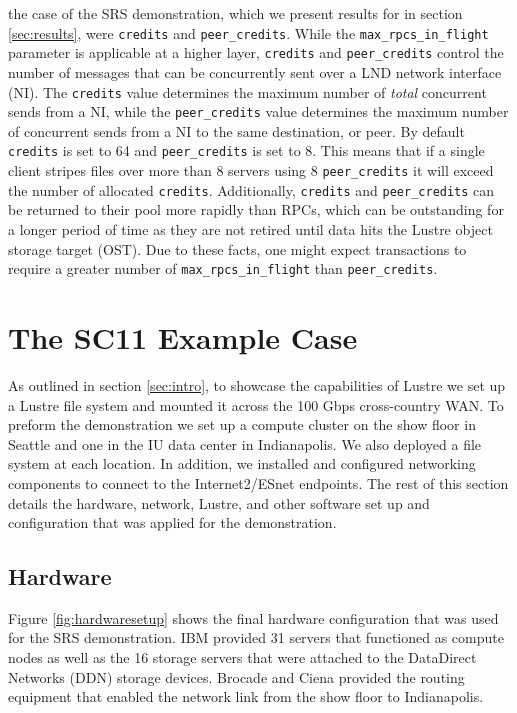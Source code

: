 \documentclass[]{sigplan-proc}
\begin{document}
the case of the SRS demonstration, which we present results for in section \ref{sec:results}, were 
{\tt credits} and {\tt peer\_credits}. While the {\tt max\_rpcs\_in\_flight} parameter is applicable at a higher
layer, {\tt credits} and {\tt peer\_credits} control the number of messages that can be concurrently sent over
a LND network interface (NI). The {\tt credits} value determines the maximum number of {\it total} concurrent
sends from a NI, while the {\tt peer\_credits} value determines the maximum number of concurrent sends from a
NI to the same destination, or peer. By default {\tt credits} is set to 64 and {\tt peer\_credits} is set to
8. This means that if a single client stripes files over more than 8 servers using 8 {\tt peer\_credits} it
will exceed the number of allocated {\tt credits}. Additionally, {\tt credits} and {\tt peer\_credits} can be
returned to their pool more rapidly than RPCs, which can be outstanding for a longer period of time as they are not
retired until data hits the Lustre object storage target (OST). Due to these facts, one might expect
transactions to require a greater number of {\tt max\_rpcs\_in\_flight} than {\tt peer\_credits}.
 

\section {The SC11 Example Case}\label{sec:usecase}

As outlined in section \ref{sec:intro}, to showcase the capabilities of Lustre we set up a Lustre
file system and mounted it across the 100 Gbps cross-country WAN. To preform the demonstration we set up a
compute cluster on the show floor in Seattle and one in the IU data center in Indianapolis. We also deployed a
file system at each location. In addition, we installed and configured networking components to connect to the
Internet2/ESnet endpoints. The rest of this section details the hardware, network, Lustre, and other software
set up and configuration that was applied for the demonstration.

\subsection{Hardware}\label{sec:hardware}

Figure \ref{fig:hardwaresetup} shows the final hardware configuration that was used for the SRS demonstration. IBM provided 31 servers that functioned as compute nodes as well as the 16 storage servers that
were attached to the DataDirect Networks (DDN) storage devices. Brocade and Ciena provided the routing
equipment that enabled the network link from the show floor to Indianapolis.
\end{document}
